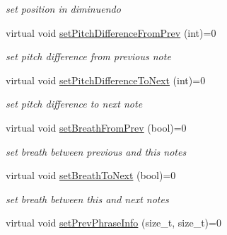 \begin{DoxyCompactItemize}
\begin{DoxyCompactList}\small\item\em set position in diminuendo \end{DoxyCompactList}\item 
\hypertarget{classsinsy_1_1INoteLabel_ad06342db34abe89d5ef26ab8970b2656}{virtual void \hyperlink{classsinsy_1_1INoteLabel_ad06342db34abe89d5ef26ab8970b2656}{set\-Pitch\-Difference\-From\-Prev} (int)=0}\label{classsinsy_1_1INoteLabel_ad06342db34abe89d5ef26ab8970b2656}

\begin{DoxyCompactList}\small\item\em set pitch difference from previous note \end{DoxyCompactList}\item 
\hypertarget{classsinsy_1_1INoteLabel_a1484fd3652fcee6b9e6859776391b36d}{virtual void \hyperlink{classsinsy_1_1INoteLabel_a1484fd3652fcee6b9e6859776391b36d}{set\-Pitch\-Difference\-To\-Next} (int)=0}\label{classsinsy_1_1INoteLabel_a1484fd3652fcee6b9e6859776391b36d}

\begin{DoxyCompactList}\small\item\em set pitch difference to next note \end{DoxyCompactList}\item 
\hypertarget{classsinsy_1_1INoteLabel_acc711c4d7e793b8b4d8d68af60b58d8d}{virtual void \hyperlink{classsinsy_1_1INoteLabel_acc711c4d7e793b8b4d8d68af60b58d8d}{set\-Breath\-From\-Prev} (bool)=0}\label{classsinsy_1_1INoteLabel_acc711c4d7e793b8b4d8d68af60b58d8d}

\begin{DoxyCompactList}\small\item\em set breath between previous and this notes \end{DoxyCompactList}\item 
\hypertarget{classsinsy_1_1INoteLabel_a8909de491adc0b26c6a92d20676b903e}{virtual void \hyperlink{classsinsy_1_1INoteLabel_a8909de491adc0b26c6a92d20676b903e}{set\-Breath\-To\-Next} (bool)=0}\label{classsinsy_1_1INoteLabel_a8909de491adc0b26c6a92d20676b903e}

\begin{DoxyCompactList}\small\item\em set breath between this and next notes \end{DoxyCompactList}\item 
\hypertarget{classsinsy_1_1INoteLabel_a2da3a8c3126f624ebb8a97695f8bf4cb}{virtual void \hyperlink{classsinsy_1_1INoteLabel_a2da3a8c3126f624ebb8a97695f8bf4cb}{set\-Prev\-Phrase\-Info} (size\-\_\-t, size\-\_\-t)=0}\label{classsinsy_1_1INoteLabel_a2da3a8c3126f624ebb8a97695f8bf4cb}


\end{DoxyCompactItemize}
